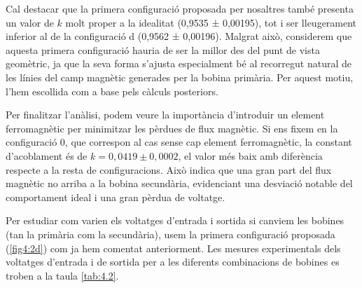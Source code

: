 \documentclass[a4paper,10.5pt]{report}
\begin{document}
Cal destacar que la primera configuració proposada per nosaltres també presenta un valor de $k$ molt proper a la idealitat (0,9535 ± 0,00195), tot i ser lleugerament inferior al de la configuració d (0,9562 ± 0,00196). Malgrat això, considerem que aquesta primera configuració hauria de ser la millor des del punt de vista geomètric, ja que la seva forma s’ajusta especialment bé al recorregut natural de les línies del camp magnètic generades per la bobina primària. Per aquest motiu, l’hem escollida com a base pels càlculs posteriors.

Per finalitzar l'anàlisi, podem veure la importància d’introduir un element ferromagnètic per minimitzar les pèrdues de flux magnètic. Si ens fixem en la configuració 0, que correspon al cas sense cap element ferromagnètic, la constant d’acoblament és de $k = 0,0419 \pm 0,0002 $, el valor més baix amb diferència respecte a la resta de configuracions. Això indica que una gran part del flux magnètic no arriba a la bobina secundària, evidenciant una desviació notable del comportament ideal i una gran pèrdua de voltatge.

Per estudiar com varien els voltatges d'entrada i sortida si canviem les bobines (tan la primària com la secundària), usem la primera configuració proposada (\ref{fig4:2d}) com ja hem comentat anteriorment. Les mesures experimentals dels voltatges d'entrada i de sortida per a les diferents combinacions de bobines es troben a la taula \ref{tab:4.2}. 
\end{document}
